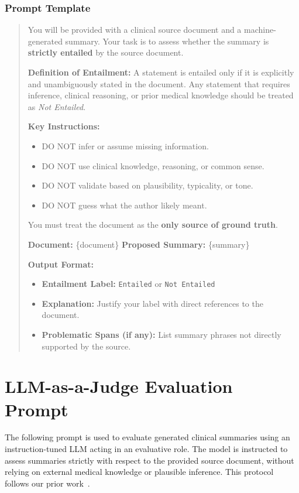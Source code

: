 \documentclass{article}
\begin{document}
\subsubsection*{Prompt Template}
\begin{quote}\small
You will be provided with a clinical source document and a machine-generated summary. Your task is to assess whether the summary is \textbf{strictly entailed} by the source document.

\medskip
\textbf{Definition of Entailment:} A statement is entailed only if it is explicitly and unambiguously stated in the document. Any statement that requires inference, clinical reasoning, or prior medical knowledge should be treated as \textit{Not Entailed}.

\medskip
\textbf{Key Instructions:}
\begin{itemize}[noitemsep]
  \item DO NOT infer or assume missing information.
  \item DO NOT use clinical knowledge, reasoning, or common sense.
  \item DO NOT validate based on plausibility, typicality, or tone.
  \item DO NOT guess what the author likely meant.
\end{itemize}
You must treat the document as the \textbf{only source of ground truth}.

\medskip
\textbf{Document:} \{document\} \quad \textbf{Proposed Summary:} \{summary\}

\medskip
\textbf{Output Format:}
\begin{itemize}[noitemsep]
  \item \textbf{Entailment Label:} \texttt{Entailed} or \texttt{Not Entailed}
  \item \textbf{Explanation:} Justify your label with direct references to the document.
  \item \textbf{Problematic Spans (if any):} List summary phrases not directly supported by the source.
\end{itemize}
\end{quote}

\section{LLM-as-a-Judge Evaluation Prompt}
\label{sec:llm_judge}

The following prompt is used to evaluate generated clinical summaries using an instruction-tuned LLM acting in an evaluative role. The model is instructed to assess summaries strictly with respect to the provided source document, without relying on external medical knowledge or plausible inference. This protocol follows our prior work~\citep{asgari2025framework}.
\end{document}
